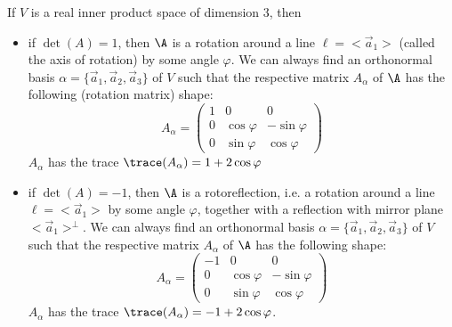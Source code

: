 \begin{theorem}
    If $V$ is a real inner product space of dimension 3, then
    \begin{itemize}
        \item if $\det(A)=1$, then $\A$ is a rotation around a line $\ell = <\vec{a}_1>$ (called the axis of rotation)
            by some angle $\varphi$. We can always find an orthonormal basis $\alpha = \{\vec{a}_1, \vec{a}_2, \vec{a}_3\}$
            of $V$ such that the respective matrix $A_\alpha$ of $\A$ has the following (rotation matrix) shape:
            $$A_\alpha = \begin{pmatrix} 1 & 0 & 0 \\ 0 & \cos\varphi & -\sin\varphi \\ 0 & \sin\varphi & \cos\varphi \end{pmatrix}$$
            $A_\alpha$ has the trace $\trace(A_\alpha) = 1 + 2\cos\varphi$
        \item if $\det(A)=-1$, then $\A$ is a rotoreflection, i.e. a rotation around a line $\ell = <\vec{a}_1>$ by some
            angle $\varphi$, together with a reflection with mirror plane $<\vec{a}_1>^\perp$. We can always find an
            orthonormal basis $\alpha = \{\vec{a}_1,\vec{a}_2, \vec{a}_3\}$ of $V$ such that the respective matrix $A_\alpha$
            of $\A$ has the following shape:
            $$A_\alpha = \begin{pmatrix}-1 & 0 & 0 \\ 0 & \cos\varphi & -\sin\varphi \\ 0 & \sin\varphi & \cos\varphi \end{pmatrix}$$
            $A_\alpha$ has the trace $\trace(A_\alpha) = -1 + 2\cos\varphi$.
    \end{itemize}
\end{theorem}

